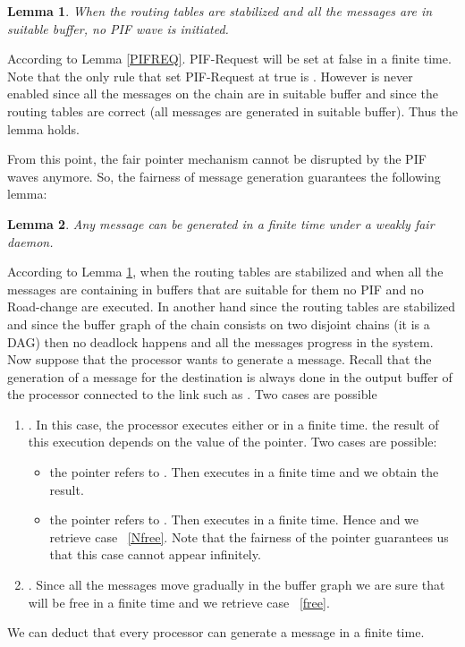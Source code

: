 \documentclass{llncs}
\renewenvironment{proof}{{\it Proof. } }{{\hfill }\vspace{.5pc}}
\newtheorem{lem}{Lemma}
\begin{document}
\begin{lem}\label{NOPIF}
When the routing tables are stabilized and all the messages are in suitable buffer, no PIF wave is initiated.
\end{lem}  

\begin{proof}
According to Lemma \ref{PIFREQ}. PIF-Request will be set at false in a finite time. Note that the only rule that set PIF-Request at true is . However  is never enabled since all the messages on the chain are in suitable buffer and since the routing tables are correct (all messages are generated in suitable buffer). Thus the lemma holds.
\end{proof}

From this point, the fair pointer mechanism cannot be disrupted by the PIF waves anymore. So, the fairness of message
generation guarantees the following lemma:
\begin{lem}\label{GMSG}
Any message can be generated in a finite time under a weakly fair daemon.
\end{lem}

\begin{proof}
According to Lemma \ref{NOPIF}, when the routing tables are stabilized and when all the messages are containing in
buffers that are suitable for them no PIF and no Road-change are executed. In another hand since the routing tables
are stabilized and since the buffer graph of the chain consists on two disjoint chains  (it is a DAG) then no deadlock
happens and all the messages progress in the system. Now suppose that the processor  wants to generate a message. Recall that the generation of a message  for the destination  is always done in the output buffer of the processor  connected to the link  such as . Two cases are possible
\begin{enumerate}
\item\label{free}{}. In this case, the processor executes either  or  in a finite time. the result of this execution depends on the value of the pointer. Two cases are possible:
\begin{itemize}
\item{the pointer refers to .} Then  executes  in a finite time and we obtain the result.
\item{the pointer refers to .} Then  executes  in a finite time. Hence  and we retrieve case ~\ref{Nfree}. Note that the fairness of the pointer guarantees us that this case cannot appear infinitely.
\end{itemize}
\item\label{Nfree}{.} Since all the messages move gradually in the buffer graph we are sure that  will be free in a finite time and we retrieve case  ~\ref{free}. \\
\end{enumerate} 
We can deduct that every processor can generate a message in a finite time.
\end{proof}
\end{document}
